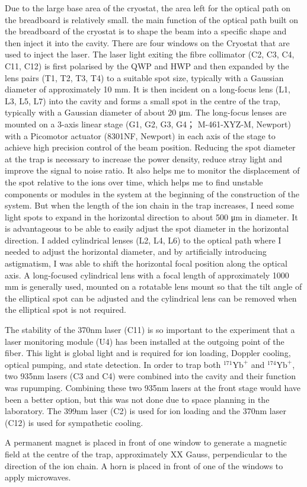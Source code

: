 Due to the large base area of the cryostat, the area left for the optical path on the breadboard is relatively small. the main function of the optical path built on the breadboard of the cryostat is to shape the beam into a specific shape and then inject it into the cavity. There are four windows on the Cryostat that are used to inject the laser. The laser light exiting the fibre collimator (C2, C3, C4, C11, C12) is first polarised by the QWP and HWP and then expanded by the lens pairs (T1, T2, T3, T4) to a suitable spot size, typically with a Gaussian diameter of approximately 10 mm. It is then incident on a long-focus lens (L1, L3, L5, L7) into the cavity and forms a small spot in the centre of the trap, typically with a Gaussian diameter of about 20 μm. The long-focus lenses are mounted on a 3-axis linear stage (G1, G2, G3, G4； M-461-XYZ-M, Newport) with a Picomotor actuator (8301NF, Newport) in each axis of the stage to achieve high precision control of the beam position. Reducing the spot diameter at the trap is necessary to increase the power density, reduce stray light and improve the signal to noise ratio. It also helps me to monitor the displacement of the spot relative to the ions over time, which helps me to find unstable components or modules in the system at the beginning of the construction of the system. But when the length of the ion chain in the trap increases, I need some light spots to expand in the horizontal direction to about 500 μm in diameter. It is advantageous to be able to easily adjust the spot diameter in the horizontal direction. I added cylindrical lenses (L2, L4, L6) to the optical path where I needed to adjust the horizontal diameter, and by artificially introducing astigmatism, I was able to shift the horizontal focal position along the optical axis. A long-focused cylindrical lens with a focal length of approximately 1000 mm is generally used, mounted on a rotatable lens mount so that the tilt angle of the elliptical spot can be adjusted and the cylindrical lens can be removed when the elliptical spot is not required.

The stability of the 370nm laser (C11) is so important to the experiment that a laser monitoring module (U4) has been installed at the outgoing point of the fiber. This light is global light and is required for ion loading, Doppler cooling, optical pumping, and state detection. In order to trap both ${ }^{171} \mathrm{Yb}^{+}$ and ${ }^{174} \mathrm{Yb}^{+}$, two 935nm lasers (C3 and C4) were combined into the cavity and their function was rupumping. Combining these two 935nm lasers at the front stage would have been a better option, but this was not done due to space planning in the laboratory. The 399nm laser (C2) is used for ion loading and the 370nm laser (C12) is used for sympathetic cooling.

A permanent magnet is placed in front of one window to generate a magnetic field at the centre of the trap, approximately XX Gauss, perpendicular to the direction of the ion chain. A horn is placed in front of one of the windows to apply microwaves.
